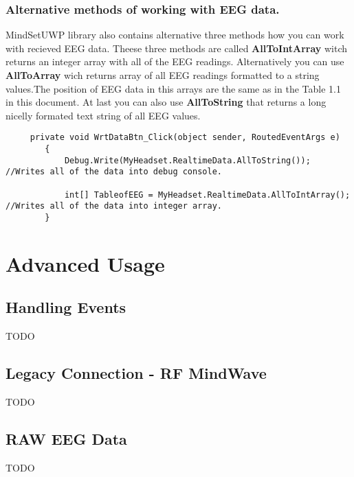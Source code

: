\documentclass[a4paper,11pt]{book}
\begin{document}
\subsection{Alternative methods of working with EEG data.}
MindSetUWP library also contains alternative three methods how you can work with recieved EEG data. Theese three methods are called \textbf{AllToIntArray} witch returns an integer array with all of the EEG readings. Alternatively you can use \textbf{AllToArray} wich returns array of all EEG readings formatted to a string values.The position of EEG data in this arrays are the same as in the Table 1.1 in this document. At last you can also use \textbf{AllToString} that returns a long nicelly formated text string of all EEG values.

\begin{lstlisting}
     private void WrtDataBtn_Click(object sender, RoutedEventArgs e)
        { 
            Debug.Write(MyHeadset.RealtimeData.AllToString());  //Writes all of the data into debug console.

            int[] TableofEEG = MyHeadset.RealtimeData.AllToIntArray();  //Writes all of the data into integer array.
        }
\end{lstlisting}


\chapter{Advanced Usage}

\section{Handling Events}
TODO

\section{Legacy Connection - RF MindWave}
TODO

\section{RAW EEG Data}
TODO
\end{document}
